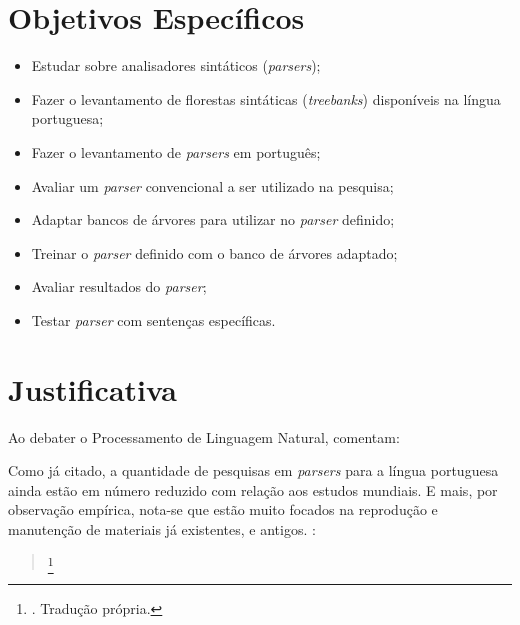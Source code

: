\section{Objetivos Específicos}\label{sec:objetivos-especificos}
\begin{itemize}
    \item Estudar sobre analisadores sintáticos (\textit{parsers});
    \item Fazer o levantamento de florestas sintáticas (\textit{treebanks}) disponíveis na língua portuguesa;
    \item Fazer o levantamento de \textit{parsers} em português;
    \item Avaliar um \textit{parser} convencional a ser utilizado na pesquisa;
    \item Adaptar bancos de árvores para utilizar no \textit{parser} definido;
    \item Treinar o \textit{parser} definido com o banco de árvores adaptado;
    \item Avaliar resultados do \textit{parser};
    \item Testar \textit{parser} com sentenças específicas.
    
\end{itemize}

\section{Justificativa}	\label{justificativa}
Ao debater o Processamento de Linguagem Natural,  comentam:
\begin{quote}
\end{quote}
Como já citado, a quantidade de pesquisas em \textit{parsers} para a língua portuguesa ainda estão em número reduzido com relação aos estudos mundiais. E mais, por observação empírica, nota-se que estão muito focados na reprodução e manutenção de materiais já existentes, e antigos.
:
\begin{quote}
    \footnote{. Tradução própria.}
\end{quote}

